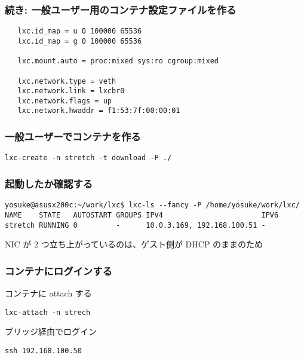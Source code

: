 \documentclass[cjk,dvipdfmx,12pt,compress,%
hyperref={bookmarks=true,bookmarksnumbered=true,bookmarksopen=false,%
colorlinks=false,%
pdftitle={第 120 回 関西 Debian 勉強会},%
pdfauthor={倉敷・のがた・佐々木・かわだ・おおつき},%
pdfsubject={資料},%
}]{beamer}
\begin{document}
\begin{frame}[fragile]
  \frametitle{続き: 一般ユーザー用のコンテナ設定ファイルを作る}
  \begin{block}{}
  \begin{verbatim}
   lxc.id_map = u 0 100000 65536
   lxc.id_map = g 0 100000 65536
   
   lxc.mount.auto = proc:mixed sys:ro cgroup:mixed
   
   lxc.network.type = veth
   lxc.network.link = lxcbr0
   lxc.network.flags = up
   lxc.network.hwaddr = f1:53:7f:00:00:01
  \end{verbatim}
  \end{block}
\end{frame}

\begin{frame}[fragile]
  \frametitle{一般ユーザーでコンテナを作る}
  \begin{block}{}
  \begin{verbatim}
lxc-create -n stretch -t download -P ./
  \end{verbatim}
  \end{block}
\end{frame}

\begin{frame}[fragile]
  \frametitle{起動したか確認する}
  \begin{block}{}
  \begin{verbatim}
yosuke@asusx200c:~/work/lxc$ lxc-ls --fancy -P /home/yosuke/work/lxc/
NAME    STATE   AUTOSTART GROUPS IPV4                       IPV6 
stretch RUNNING 0         -      10.0.3.169, 192.168.100.51 -    
  \end{verbatim}
  \end{block}
  \begin{block}{}
  NIC が 2 つ立ち上がっているのは、ゲスト側が DHCP のままのため
  \end{block}
\end{frame}

\begin{frame}[fragile]
  \frametitle{コンテナにログインする}
  \begin{block}{コンテナに attach する}
  \begin{verbatim}
lxc-attach -n strech
  \end{verbatim}
  \end{block}
  \begin{block}{ブリッジ経由でログイン}
  \begin{verbatim}
ssh 192.168.100.50 
  \end{verbatim}
  \end{block}
\end{frame}
\end{document}

